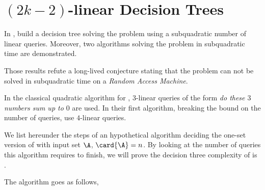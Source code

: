 \section{$(2k-2)$-linear Decision Trees}

In \cite{gronlund:2014}, \citeauthor{gronlund:2014} build a decision tree
solving the \threeSUM problem using
a subquadratic number of linear queries. Moreover, two algorithms
solving the \threeSUM problem in subquadratic time are demonstrated.

Those results refute a long-lived conjecture stating that the \threeSUM problem
can not be solved in subquadratic time on a \emph{Random Access Machine}.

In the classical quadratic algorithm for \threeSUM, $3$-linear queries of the
form \emph{do these $3$ numbers sum up to $0$} are used. In their first
algorithm, breaking the  bound on the number of queries,
\citeauthor{gronlund:2014} use $4$-linear queries.

We list hereunder the steps of an hypothetical algorithm deciding the one-set
version of \threeSUM with input set $\A$, $\card{\A} = n$. By looking at the
number of queries this algorithm requires to finish, we will prove the
decision three complexity of \threeSUM is .

The algorithm goes as follows,

